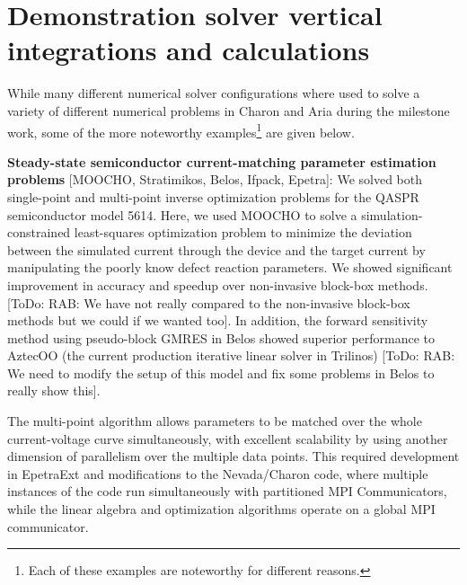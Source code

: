 \documentclass[pdf,ps2pdf,11pt]{SANDreport}
\begin{document}

%
\section{Demonstration solver vertical integrations and calculations}
\label{sec:demonstration}
%

While many different numerical solver configurations where used to solve a
variety of different numerical problems in Charon and Aria during the
milestone work, some of the more noteworthy examples\footnote{Each of these
examples are noteworthy for different reasons.} are given below.


{}\noindent\textbf{Steady-state semiconductor current-matching parameter
estimation problems} [MOOCHO, Stratimikos, Belos, Ifpack, Epetra]: We solved
both single-point and multi-point inverse optimization problems for the QASPR
semiconductor model 5614.  Here, we used MOOCHO to solve a
simulation-constrained least-squares optimization problem to minimize the
deviation between the simulated current through the device and the target
current by manipulating the poorly know defect reaction parameters.  We showed
significant improvement in accuracy and speedup over non-invasive block-box
methods. [ToDo: RAB: We have not really compared to the non-invasive block-box
methods but we could if we wanted too].  In addition, the forward sensitivity
method using pseudo-block GMRES in Belos showed superior performance to
AztecOO (the current production iterative linear solver in Trilinos) [ToDo:
RAB: We need to modify the setup of this model and fix some problems in Belos
to really show this].


The multi-point algorithm allows parameters to be matched over the whole
current-voltage curve simultaneously, with excellent scalability by using
another dimension of parallelism over the multiple data points.  This required
development in EpetraExt and modifications to the Nevada/Charon code, where
multiple instances of the code run simultaneously with partitioned MPI
Communicators, while the linear algebra and optimization algorithms operate on
a global MPI communicator.

\end{document}
